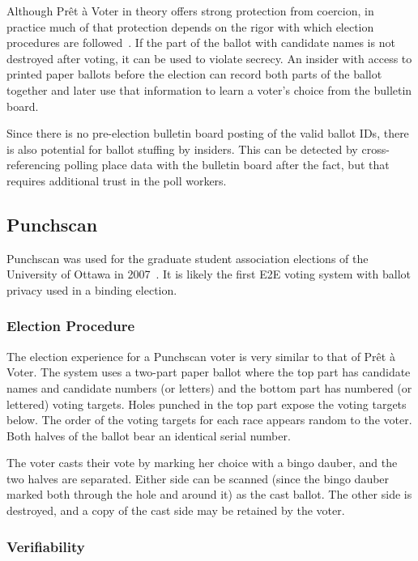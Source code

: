 Although Prêt à Voter in theory offers strong protection from
coercion, in practice much of that protection depends on the rigor
with which election procedures are followed~\cite{burton2012}. If the
part of the ballot with candidate names is not destroyed after voting,
it can be used to violate secrecy. An insider with access to printed
paper ballots before the election can record both parts of the ballot
together and later use that information to learn a voter's choice from
the bulletin board.

Since there is no pre-election bulletin board posting of the valid
ballot IDs, there is also potential for ballot stuffing by
insiders. This can be detected by cross-referencing polling place
data with the bulletin board after the fact, but that requires
additional trust in the poll workers.

\subsection{Punchscan~\cite{popoveniuc2006,popoveniuc2010punchscan}}
\label{sec:punchscan}

Punchscan was used for the graduate student association elections of
the University of Ottawa in 2007~\cite{essex2007}. It is likely
the first E2E voting system with ballot privacy used in a binding
election.

\subsubsection{Election Procedure}

The election experience for a Punchscan voter is very similar to that
of Prêt à Voter. The system uses a two-part paper ballot where the top
part has candidate names and candidate numbers (or letters) and the
bottom part has numbered (or lettered) voting targets. Holes punched
in the top part expose the voting targets below. The order of the
voting targets for each race appears random to the voter. Both halves
of the ballot bear an identical serial number.

The voter casts their vote by marking her choice with a bingo dauber,
and the two halves are separated. Either side can be scanned (since
the bingo dauber marked both through the hole and around it) as the
cast ballot. The other side is destroyed, and a copy of the cast side
may be retained by the voter.

\subsubsection{Verifiability}

